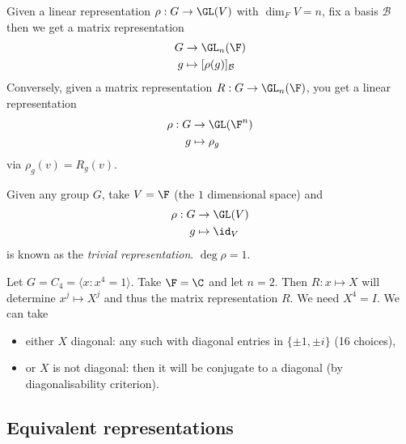 \documentclass[a4paper]{article}
\begin{document}
Given a linear representation \(\rho: G \to \GL(V)\) with \(\dim_FV = n\), fix a basis \(\mathcal B\) then we get a matrix representation
\begin{align*}
  G &\to \GL_n(\F) \\
  g &\mapsto [\rho(g)]_{\mathcal B}
\end{align*}
Conversely, given a matrix representation \(R: G \to \GL_n(\F)\), you get a linear representation
\begin{align*}
  \rho: G &\to \GL(\F^n) \\
  g &\mapsto \rho_g
\end{align*}
via \(\rho_g(v) = R_g(v)\).

\begin{eg}
  Given any group \(G\), take \(V = \F\) (the \(1\) dimensional space) and
  \begin{align*}
    \rho: G &\to \GL(V) \\
    g &\mapsto \id_V
  \end{align*}
  is known as the \emph{trivial representation}. \(\deg \rho = 1\).
\end{eg}

\begin{eg}
  Let \(G = C_4 = \langle x: x^4 = 1 \rangle\). Take \(\F = \C\) and let \(n = 2\). Then \(R: x \mapsto X\) will determine \(x^j \mapsto X^j\) and thus the matrix representation \(R\). We need \(X^4 = I\). We can take
  \begin{itemize}
  \item either \(X\) diagonal: any such with diagonal entries in \(\{\pm 1, \pm i\}\) (16 choices),
  \item or \(X\) is not diagonal: then it will be conjugate to a diagonal (by diagonalisability criterion).
  \end{itemize}
\end{eg}

\subsection{Equivalent representations}
\end{document}
